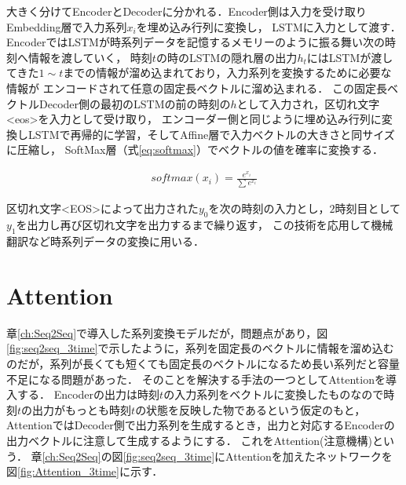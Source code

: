 \documentclass[a4j,11pt,report]{jsbook}
\begin{document}
大きく分けてEncoderとDecoderに分かれる．Encoder側は入力を受け取りEmbedding層で入力系列$x_{i}$を埋め込み行列に変換し，
LSTMに入力として渡す．EncoderではLSTMが時系列データを記憶するメモリーのように振る舞い次の時刻へ情報を渡していく，
時刻$t$の時のLSTMの隠れ層の出力$h_{t}$にはLSTMが渡してきた$1 \sim t$までの情報が溜め込まれており，入力系列を変換するために必要な情報が
エンコードされて任意の固定長ベクトルに溜め込まれる．
この固定長ベクトルDecoder側の最初のLSTMの前の時刻の$h$として入力され，区切れ文字<eos>を入力として受け取り，
エンコーダー側と同じように埋め込み行列に変換しLSTMで再帰的に学習，そしてAffine層で入力ベクトルの大きさと同サイズに圧縮し，
SoftMax層（式\ref{eq:softmax}）でベクトルの値を確率に変換する．

\begin{equation}
  \label{eq:softmax}
  \begin{split}
    softmax(x_{i}) = \frac{ e^{x_{i}} }{ \sum e^{x_{i}} }
  \end{split}
\end{equation}

区切れ文字<EOS>によって出力された$y_{0}$を次の時刻の入力とし，$2$時刻目として$y_{1}$を出力し再び区切れ文字を出力するまで繰り返す，
この技術を応用して機械翻訳など時系列データの変換に用いる．

\chapter{Attention\label{ch:attention} }
章\ref{ch:Seq2Seq}で導入した系列変換モデルだが，問題点があり，図\ref{fig:seq2seq_3time}で示したように，系列を固定長のベクトルに情報を溜め込むのだが，系列が長くても短くても固定長のベクトルになるため長い系列だと容量不足になる問題があった．
そのことを解決する手法の一つとしてAttentionを導入する．
Encoderの出力は時刻$t$の入力系列をベクトルに変換したものなので時刻$t$の出力がもっとも時刻$t$の状態を反映した物であるという仮定のもと，
AttentionではDecoder側で出力系列を生成するとき，出力と対応するEncoderの出力ベクトルに注意して生成するようにする．
これをAttention(注意機構)という．
章\ref{ch:Seq2Seq}の図\ref{fig:seq2seq_3time}にAttentionを加えたネットワークを図\ref{fig:Attention_3time}に示す．
\end{document}
